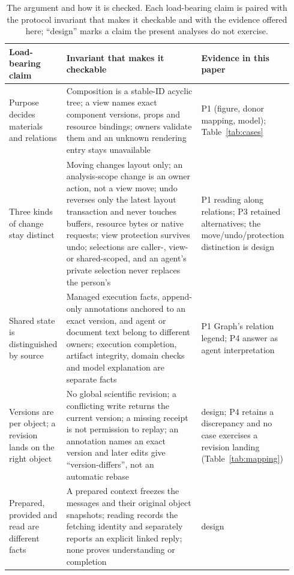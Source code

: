 \documentclass[11pt]{article}
\begin{document}
\begin{table}[H]
\centering
\footnotesize
\caption{The argument and how it is checked. Each load-bearing claim is paired with the protocol invariant that makes it checkable and with the evidence offered here; ``design'' marks a claim the present analyses do not exercise.}
\label{tab:argument}
\begin{tabular}{@{}>{\raggedright\arraybackslash}p{0.20\linewidth} >{\raggedright\arraybackslash}p{0.47\linewidth} >{\raggedright\arraybackslash}p{0.27\linewidth}@{}}
\hline
Load-bearing claim & Invariant that makes it checkable & Evidence in this paper \\
\hline
Purpose decides materials and relations & Composition is a stable-ID acyclic tree; a view names exact component versions, props and resource bindings; owners validate them and an unknown rendering entry stays unavailable & P1 (figure, donor mapping, model); Table~\ref{tab:cases} \\
\hline
Three kinds of change stay distinct & Moving changes layout only; an analysis-scope change is an owner action, not a view move; undo reverses only the latest layout transaction and never touches buffers, resource bytes or native requests; view protection survives undo; selections are caller-, view- or shared-scoped, and an agent's private selection never replaces the person's & P1 reading along relations; P3 retained alternatives; the move/undo/protection distinction is design \\
\hline
Shared state is distinguished by source & Managed execution facts, append-only annotations anchored to an exact version, and agent or document text belong to different owners; execution completion, artifact integrity, domain checks and model explanation are separate facts & P1 Graph's relation legend; P4 answer as agent interpretation \\
\hline
Versions are per object; a revision lands on the right object & No global scientific revision; a conflicting write returns the current version; a missing receipt is not permission to replay; an annotation names an exact version and later edits give ``version-differs'', not an automatic rebase & design; P4 retains a discrepancy and no case exercises a revision landing (Table~\ref{tab:mapping}) \\
\hline
Prepared, provided and read are different facts & A prepared context freezes the messages and their original object snapshots; reading records the fetching identity and separately reports an explicit linked reply; none proves understanding or completion & design \\

\end{tabular}
\end{table}
\end{document}
